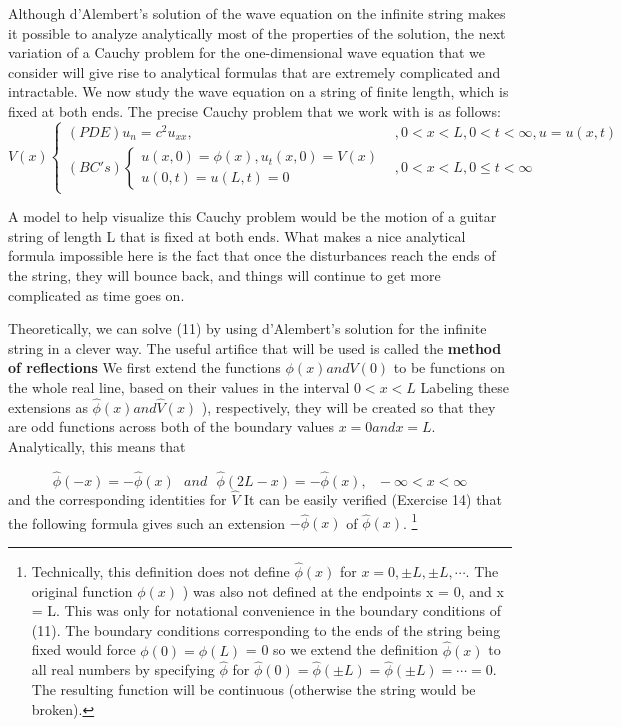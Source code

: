 \documentclass[../main.tex]{subfiles}
\begin{document}
Although d'Alembert's solution of the wave equation on the infinite string makes
it possible to analyze analytically most of the properties of the solution, the next
variation of a Cauchy problem for the one-dimensional wave equation that we
consider will give rise to analytical formulas that are extremely complicated and
intractable. We now study the wave equation on a string of finite length, which is
fixed at both ends. The precise Cauchy problem that we work with is as follows:
\begin{equation} \label{eqa11}
V(x)
	\begin{cases} 
(PDE) u_n=c^2 u_{xx}, &  ,0 < x < L, 0< t< \infty ,  u=u(x,t)\\
(BC's)
		\begin{cases}
		u(x,0)=\phi(x), u_t(x,0)=V(x)\\
		u(0,t)=u(L,t)=0
		\end{cases} 
		& ,0 < x < L, 0\leqslant t  < \infty
	\end{cases}
\end{equation}

A model to help visualize this Cauchy problem would be the motion of a guitar
string of length L that is fixed at both ends. What makes a nice analytical formula
impossible here is the fact that once the disturbances reach the ends of the string,
they will bounce back, and things will continue to get more complicated as time
goes on.

Theoretically, we can solve (11) by using d'Alembert's solution for the infinite
string in a clever way. The useful artifice that will be used is called the \textbf{method of
reflections} We first extend the functions $\phi(x) and V(0)$  to be functions on the
whole real line, based on their values in the interval $ 0< x < L$  Labeling these
extensions as $\hat{\phi}(x) and \hat{V}(x)$ ), respectively, they will be created so that they are
odd functions across both of the boundary values $x = 0 and x = L$. Analytically,
this means that

\begin{equation}\label{eqa12}
\hat{\phi}(-x)= -\hat{\phi}(x) ~~~and~~~ \hat{\phi}(2L - x) = -\hat{\phi}(x),~~~ -\infty < x<\infty
\end{equation}
and the corresponding identities for $\hat{V}$ It can be easily verified (Exercise 14)
that the following formula gives such an extension $-\hat{\phi}(x)$ of $\hat{\phi}(x)$.
\footnote{ Technically, this definition does not define
$\hat{\phi}(x)$ for $x=0, \pm L, \pm L, \cdots .$ The original function $\phi(x)$ ) was also not defined at the endpoints x = 0, and x = L. This was only for notational convenience
in the boundary conditions of (11). The boundary conditions corresponding to the ends of the string
being fixed would force   $\phi(0) = \phi(L)$ = 0 so we extend the definition $\hat{\phi}(x)$ to all real numbers by
specifying $\hat{\phi}$ for $\hat{\phi}(0)=\hat{\phi} (\pm L) =\hat{\phi}(\pm L) = \cdots =0.$  The resulting function will be continuous (otherwise the
string would be broken). }
\end{document}
